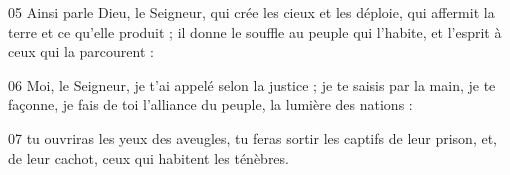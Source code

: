 
05 Ainsi parle Dieu, le Seigneur, qui crée les cieux et les déploie, qui affermit la terre et ce qu’elle produit ; il donne le souffle au peuple qui l’habite, et l’esprit à ceux qui la parcourent :

06 Moi, le Seigneur, je t’ai appelé selon la justice ; je te saisis par la main, je te façonne, je fais de toi l’alliance du peuple, la lumière des nations :

07 tu ouvriras les yeux des aveugles, tu feras sortir les captifs de leur prison, et, de leur cachot, ceux qui habitent les ténèbres.

